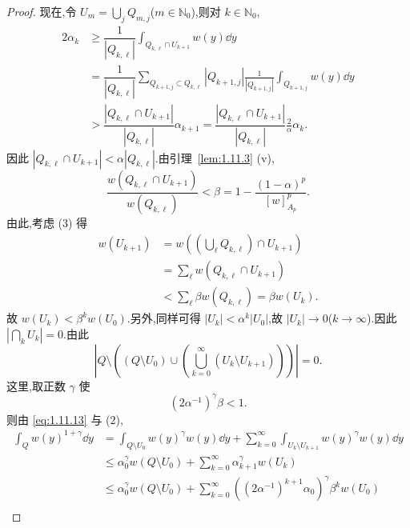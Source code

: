 \begin{proof}
现在,令 $U_{m} = \bigcup_{j}Q_{m,j}$($m \in \mathbb{N}_{0}$),则对 $k \in \mathbb{N}_{0}$,
\begin{align*}
2\alpha_{k} &\geq \dfrac{1}{|Q_{k,\ell}|}\displaystyle\int_{Q_{k,\ell} \cap U_{k+1}}w(y)\dd y \\
&= \dfrac{1}{|Q_{k,\ell}|}\displaystyle\sum_{Q_{k+1,j} \subset Q_{k,\ell}}|Q_{k+1,j}|\frac{1}{|Q_{k+1,j}|}\int_{Q_{k+1,j}}w(y)\dd y \\
&> \dfrac{|Q_{k,\ell} \cap U_{k+1}|}{|Q_{k,\ell}|}\alpha_{k+1} = \dfrac{|Q_{k,\ell} \cap U_{k+1}|}{|Q_{k,\ell}|}\frac{2}{\alpha}\alpha_{k}.
\end{align*}
因此 $|Q_{k,\ell} \cap U_{k+1}| < \alpha|Q_{k,\ell}|$.由引理~\ref{lem:1.11.3} (v),
\begin{equation*}
\frac{w(Q_{k,\ell} \cap U_{k+1})}{w(Q_{k,\ell})} < \beta = 1 - \frac{(1 - \alpha)^{p}}{[w]_{A_{p}}^{p}}.
\end{equation*}
由此,考虑 (3) 得
\begin{align*}
w(U_{k+1}) &= w\left(\left(\bigcup_{\ell}Q_{k,\ell}\right) \cap U_{k+1}\right) \\
&= \displaystyle\sum_{\ell}w(Q_{k,\ell} \cap U_{k+1}) \\
&< \displaystyle\sum_{\ell}\beta w(Q_{k,\ell}) = \beta w(U_{k}).
\end{align*}
故 $w(U_{k}) < \beta^{k}w(U_{0})$.另外,同样可得 $|U_{k}| < \alpha^{k}|U_{0}|$,故 $|U_{k}| \to 0$($k \to \infty$).因此 $|\bigcap_{k}U_{k}| = 0$.由此
\begin{equation}\tag{1.11.13}
\left|Q \setminus \left((Q \setminus U_{0}) \cup \left(\bigcup_{k=0}^{\infty}(U_{k} \setminus U_{k+1})\right)\right)\right| = 0.
\label{eq:1.11.13}\end{equation}
这里,取正数 $\gamma$ 使
\begin{equation*}
(2\alpha^{-1})^{\gamma}\beta < 1.
\end{equation*}
则由 \eqref{eq:1.11.13} 与 (2),
\begin{align*}
\displaystyle\int_{Q}w(y)^{1+\gamma}\dd y &= \int_{Q \setminus U_{0}}w(y)^{\gamma}w(y)\dd y + \sum_{k=0}^{\infty}\int_{U_{k} \setminus U_{k+1}}w(y)^{\gamma}w(y)\dd y \\
\qquad &\leq \alpha_{0}^{\gamma}w(Q \setminus U_{0}) + \displaystyle\sum_{k=0}^{\infty}\alpha_{k+1}^{\gamma}w(U_{k}) \\
\qquad &\leq \alpha_{0}^{\gamma}w(Q \setminus U_{0}) + \displaystyle\sum_{k=0}^{\infty}\left((2\alpha^{-1})^{k+1}\alpha_{0}\right)^{\gamma}\beta^{k}w(U_{0}) \\

\end{align*}
\end{proof}
